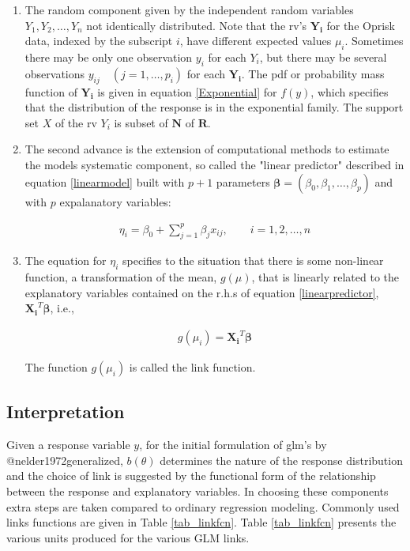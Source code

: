 \documentclass[]{article}
\begin{document}
\begin{enumerate}
\item The random component given by the independent random variables $Y_1, Y_2, \ldots, Y_n $ not identically distributed. Note that the rv's $\mathbf{Y_i}$ for the Oprisk data, indexed by the subscript $i$, have different expected values $\mu_i$. Sometimes there may be only one observation $y_i$ for each $Y_i$, but there may be several observations $y_{ij} \quad (j=1,\ldots,p_i)$ for each $\mathbf{Y_i}$. The pdf or probability mass function of $\mathbf{Y_i}$ is given in equation \ref{Exponential} for $f(y)$, which specifies that the distribution of the response is in the exponential family. The support set $X$ of the rv $Y_i$ is subset of $\mathbf{N}$ of $\mathbf{R}$. 

\item The second advance is the extension of computational methods to estimate the models systematic component, so called the "linear predictor" described in equation \ref{linearmodel} built with $p+1$ parameters $\mathbf{\beta} = (\beta_0,\beta_1,\ldots,\beta_p)$ and with $p$ expalanatory variables:

\singlespacing
\begin{eqnarray}\label{linearpredictor}
\eta_i = \beta_0 + \sum_{j=1}^{p}\beta_jx_{ij}, \qquad i = 1,2,\ldots,n
\end{eqnarray}
\doublespacing

\item The equation for $\eta_i$ specifies to the situation that there is some non-linear function, a transformation of the mean, $g(\mu)$, that is linearly related to the explanatory variables contained on the r.h.s of equation \ref{linearpredictor}, $\mathbf{X_i}^T\mathbf{\beta}$, i.e.,

\singlespacing
\begin{eqnarray}
g(\mu_i) = \mathbf{X_i}^T\mathbf{\beta}
\end{eqnarray}
\doublespacing

The function $g(\mu_i)$ is called the link function.
\end{enumerate}

\subsection{Interpretation}

Given a response variable \(y\), for the initial formulation of glm's by
@nelder1972generalized, \(b(\theta)\) determines the nature of the
response distribution and the choice of link is suggested by the
functional form of the relationship between the response and explanatory
variables. In choosing these components extra steps are taken compared
to ordinary regression modeling. Commonly used links functions are given
in Table \ref{tab_linkfcn}. Table \ref{tab_linkfcn} presents the various
units produced for the various GLM links.
\end{document}
